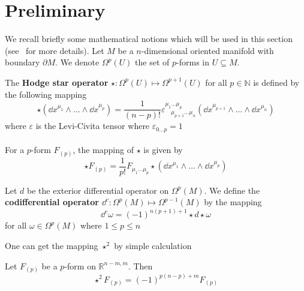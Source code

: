 \section{Preliminary}
We recall briefly some mathematical notions which will be used in this section (see~\cite{Zeidler1995} for more details).
Let $M$ be a $n$-dimensional oriented manifold with boundary $\partial M$.
We denote $\Omega^p(U)$ the set of $p$-forms in $U\subseteq M$. 
\begin{definition}
The \textbf{Hodge star operator} $\star : \Omega^p(U) \mapsto \Omega^{p+1}(U)$ for all $p\in\mathbb{N}$ is defined by the following mapping
\begin{equation*}
\star ( \dd x^{\mu_1}\wedge\ldots\wedge\dd x^{\mu_p}) = 
\frac{1}{(n-p)!}\varepsilon^{\mu_1\ldots\mu_p}_{\quad\mu_{p+1}\ldots\mu_n}(\dd x^{\mu_{p+1}}\wedge\ldots\wedge\dd x^{\mu_n})
\end{equation*}
where $\varepsilon$ is the Levi-Civita tensor where $\varepsilon_{0\ldots p} = 1$ \\\\
For a $p$-form $F_{(p)}$, the mapping of $\star$ is given by
\begin{equation*}
\star F_{(p)} = \frac 1 {p !} F_{\mu_1\ldots\mu_p} \star(\dd x^{\mu_1}\wedge\ldots\wedge \dd x^{\mu_p})
\end{equation*}
\end{definition}
%
\begin{definition}
Let $d$ be the exterior differential operator on $\Omega^p(M)$. We define the \textbf{codifferential operator} $\dd^c: \Omega^p(M) \mapsto \Omega^{p-1}(M)$ by the mapping
\begin{equation*}
\dd^c \omega = (-1)^{n(p+1)+1}\star d \star \omega
\end{equation*}
for all $\omega\in\Omega^p(M)$ where $1 \leq p \leq n$
\end{definition}
%
One can get the mapping $\star^2$ by simple calculation
\begin{proposition}
Let $F_{(p)}$ be a $p$-form on $\mathbb{R}^{n-m, m}$. Then
\begin{equation*}
\star^2 F_{(p)} = (-1)^{p(n-p)+m}F_{(p)}
\end{equation*}
\end{proposition}
